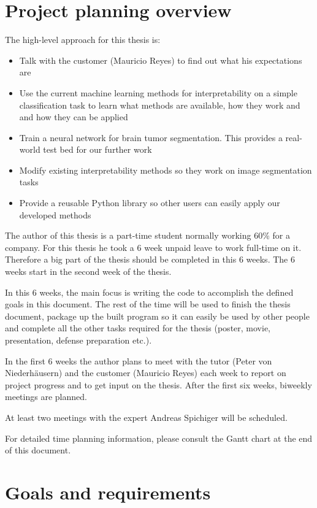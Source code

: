 \section{Project planning overview}

The high-level approach for this thesis is:
\begin{itemize}
    \item Talk with the customer (Mauricio Reyes) to find out what his expectations are
    \item Use the current machine learning methods for interpretability on a simple classification task to learn what methods are available, how they work and and how they can be applied
    \item Train a neural network for brain tumor segmentation. This provides a real-world test bed for our further work
    \item Modify existing interpretability methods so they work on image segmentation tasks
    \item Provide a reusable Python library so other users can easily apply our developed methods
\end{itemize}

The author of this thesis is a part-time student normally working 60\% for a company. For this thesis he took a 6 week unpaid leave to work full-time on it.
Therefore a big part of the thesis should be completed in this 6 weeks. The 6 weeks start in the second week of the thesis.

In this 6 weeks, the main focus is writing the code to accomplish the defined goals in this document. The rest of the time will be used to finish the thesis document, package up the built program so it can easily be used by other people and complete all the other tasks required for the thesis (poster, movie, presentation, defense preparation etc.).

In the first 6 weeks the author plans to meet with the tutor (Peter von Niederhäusern) and the customer (Mauricio Reyes) each week to report on project progress and to get input on the thesis.
After the first six weeks, biweekly meetings are planned.

At least two meetings with the expert Andreas Spichiger will be scheduled.

For detailed time planning information, please consult the Gantt chart at the end of this document.

\section{Goals and requirements}

